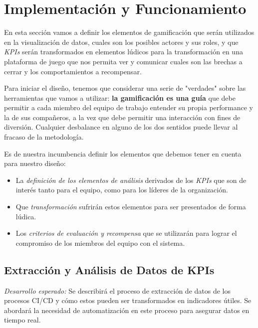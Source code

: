 \documentclass[journal]{IEEEtran}
\begin{document}
\section{\textbf{\Large Implementación y Funcionamiento}}

En esta sección vamos a definir los elementos de gamificación que serán utilizados en la visualización de datos, cuales son los posibles actores y sus roles, y que \textit{KPIs} serán transformados en elementos lúdicos para la transformación en una plataforma de juego que nos permita ver y comunicar cuales son las brechas a cerrar y los comportamientos a recompensar.

Para iniciar el diseño, tenemos que considerar una serie de "verdades" sobre las herramientas que vamos a utilizar: \textbf{la gamificación es una guía} que debe permitir a cada miembro del equipo de trabajo entender su propia performance y la de sus compañeros, a la vez que debe permitir una interacción con fines de diversión. Cualquier desbalance en alguno de los dos sentidos puede llevar al fracaso de la metodología\cite[Quinta Parte: Gamificación - De los desafíos y misiones]{nallar2015estructuraludica}.

Es de nuestra incumbencia definir los elementos que debemos tener en cuenta para nuestro diseño:

\begin{itemize}
    \item La \textit{definición de los elementos de análisis} derivados de los \textit{KPIs} que son de interés tanto para el equipo, como para los líderes de la organización.
    \item Que \textit{transformación} sufrirán estos elementos para ser presentados de forma lúdica.
    \item Los \textit{criterios de evaluación y recompensa} que se utilizarán para lograr el compromiso de los miembros del equipo con el sistema.
\end{itemize}

\subsection{\textbf{Extracción y Análisis de Datos de KPIs}}

\textit{Desarrollo esperado:} Se describirá el proceso de extracción de datos de los procesos CI/CD y cómo estos pueden ser transformados en indicadores útiles. Se abordará la necesidad de automatización en este proceso para asegurar datos en tiempo real.
\end{document}
